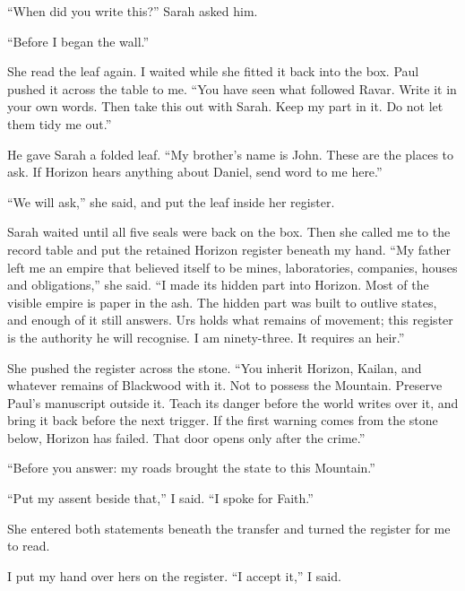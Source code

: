 ``When did you write this?'' Sarah asked him.\par

``Before I began the wall.''\par

She read the leaf again. I waited while she fitted it back into the box. Paul pushed it across the table to me. ``You have seen what followed Ravar. Write it in your own words. Then take this out with Sarah. Keep my part in it. Do not let them tidy me out.''\par

He gave Sarah a folded leaf. ``My brother's name is John. These are the places to ask. If Horizon hears anything about Daniel, send word to me here.''\par

``We will ask,'' she said, and put the leaf inside her register.\par

Sarah waited until all five seals were back on the box. Then she called me to the record table and put the retained Horizon register beneath my hand. ``My father left me an empire that believed itself to be mines, laboratories, companies, houses and obligations,'' she said. ``I made its hidden part into Horizon. Most of the visible empire is paper in the ash. The hidden part was built to outlive states, and enough of it still answers. Urs holds what remains of movement; this register is the authority he will recognise. I am ninety-three. It requires an heir.''\par

She pushed the register across the stone. ``You inherit Horizon, Kailan, and whatever remains of Blackwood with it. Not to possess the Mountain. Preserve Paul's manuscript outside it. Teach its danger before the world writes over it, and bring it back before the next trigger. If the first warning comes from the stone below, Horizon has failed. That door opens only after the crime.''\par

``Before you answer: my roads brought the state to this Mountain.''\par

``Put my assent beside that,'' I said. ``I spoke for Faith.''\par

She entered both statements beneath the transfer and turned the register for me to read.\par

I put my hand over hers on the register. ``I accept it,'' I said.\par

